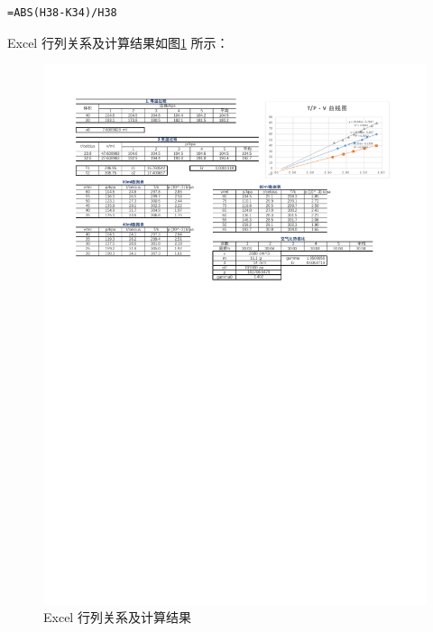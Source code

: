 \documentclass[12pt]{article}
\begin{document}
\begin{Verbatim}[frame=single]
    =ABS(H38-K34)/H38
\end{Verbatim}
Excel 行列关系及计算结果如图\ref{fig:final_table} 所示：
\begin{figure}[H] %
    \centering
    \includegraphics[width=\textwidth]{./figures/F2.pdf} 
    \caption{Excel 行列关系及计算结果}
    \label{fig:final_table}
\end{figure}
\end{document}
